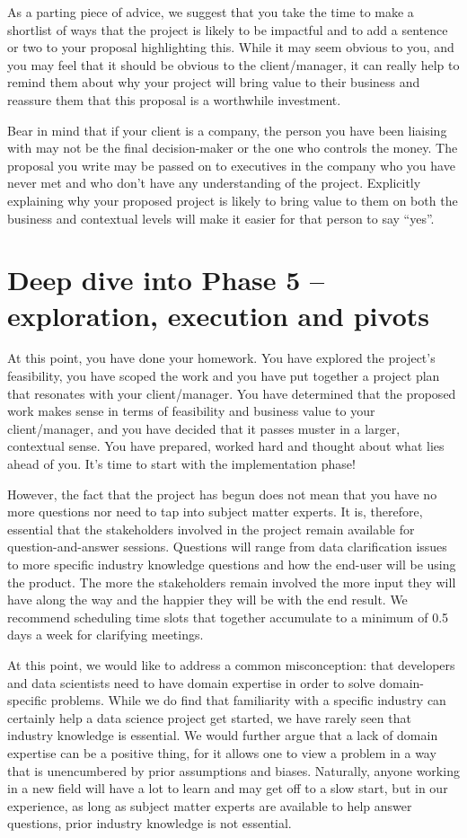 \documentclass[
]{book}
\begin{document}
As a parting piece of advice, we suggest that you take the time to make a shortlist of ways that the project is likely to be impactful and to add a sentence or two to your proposal highlighting this. While it may seem obvious to you, and you may feel that it should be obvious to the client/manager, it can really help to remind them about why your project will bring value to their business and reassure them that this proposal is a worthwhile investment.

Bear in mind that if your client is a company, the person you have been liaising with may not be the final decision-maker or the one who controls the money. The proposal you write may be passed on to executives in the company who you have never met and who don't have any understanding of the project. Explicitly explaining why your proposed project is likely to bring value to them on both the business and contextual levels will make it easier for that person to say ``yes''.

\hypertarget{execution}{%
\chapter{Deep dive into Phase 5 -- exploration, execution and pivots}\label{execution}}

At this point, you have done your homework. You have explored the project's feasibility, you have scoped the work and you have put together a project plan that resonates with your client/manager. You have determined that the proposed work makes sense in terms of feasibility and business value to your client/manager, and you have decided that it passes muster in a larger, contextual sense. You have prepared, worked hard and thought about what lies ahead of you. It's time to start with the implementation phase!

However, the fact that the project has begun does not mean that you have no more questions nor need to tap into subject matter experts. It is, therefore, essential that the stakeholders involved in the project remain available for question-and-answer sessions. Questions will range from data clarification issues to more specific industry knowledge questions and how the end-user will be using the product. The more the stakeholders remain involved the more input they will have along the way and the happier they will be with the end result. We recommend scheduling time slots that together accumulate to a minimum of 0.5 days a week for clarifying meetings.

At this point, we would like to address a common misconception: that developers and data scientists need to have domain expertise in order to solve domain-specific problems. While we do find that familiarity with a specific industry can certainly help a data science project get started, we have rarely seen that industry knowledge is essential. We would further argue that a lack of domain expertise can be a positive thing, for it allows one to view a problem in a way that is unencumbered by prior assumptions and biases. Naturally, anyone working in a new field will have a lot to learn and may get off to a slow start, but in our experience, as long as subject matter experts are available to help answer questions, prior industry knowledge is not essential.
\end{document}
